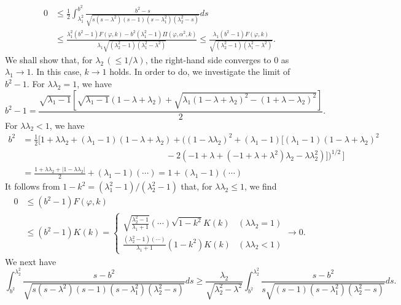 \documentclass[11pt]{amsart}
\numberwithin{equation}{section}
\numberwithin{figure}{section}
\theoremstyle{plain} %
\theoremstyle{definition} %
\begin{document}
\begin{align}
\nonumber 0 & \leq \frac{1}{2}\int_{\lambda_1^2}^{b^2} \frac{b^2-s}{\sqrt{s(s-\lambda^2)(s-1)(s-\lambda_1^2)(\lambda_2^2-s)}}ds \\
& \leq 
\frac{\lambda_1^2 (b^2-1) F (\varphi,k) 
- b^2 (\lambda_1^2-1) \Pi (\varphi,\alpha^2,k) }{\lambda_1 \sqrt{(\lambda_2^2-1)(\lambda_1^2-\lambda^2)}}
\leq 
\frac{\lambda_1 (b^2-1) F (\varphi,k)}{\sqrt{(\lambda_2^2-1)(\lambda_1^2-\lambda^2)}}. \label{key_estimates_1}
\end{align}
We shall show that, for $\lambda_2 \,(\leq 1/\lambda)$, the right-hand side converges to $0$ 
as $\lambda_1\to 1$. 
In this case, $k\to 1$ holds. In order to do, we investigate the limit of $b^2-1$. 
For $\lambda\lambda_2=1$, we have 
\[
 b^2-1 
 =\frac{\sqrt{\lambda_1-1} [ \sqrt{\lambda_1-1} (1-\lambda+\lambda_2)+\sqrt{\lambda_1(1-\lambda+\lambda_2)^2-(1+\lambda-\lambda_2)^2} ]}{2}. 
\]
For $\lambda\lambda_2< 1$, we have 
\begin{align*}
b^2 &= \frac{1}{2} \bigg[1+\lambda\lambda_2 + (\lambda_1-1)(1-\lambda+\lambda_2) 
+ \bigg((1-\lambda\lambda_2)^2 +(\lambda_1-1) [ (\lambda_1-1)(1-\lambda+\lambda_2)^2 \\
& \hspace{200pt} -2 (-1+\lambda+(-1+\lambda+\lambda^2) \lambda_2-\lambda\lambda_2^2)]\bigg)^{1/2}\, \bigg] \\
&= \frac{1+\lambda\lambda_2 + |1-\lambda\lambda_2|}{2} +(\lambda_1-1) (\cdots) 
 = 1 +(\lambda_1-1) (\cdots)
\end{align*}
It follows from $1-k^2 = (\lambda_1^2-1)/(\lambda_2^2-1)$ that, for $\lambda \lambda_2 \leq 1$, we find 
\begin{align*}
0 & \leq (b^2-1) F (\varphi,k) \\
& \leq (b^2-1) K (k) 
=
\begin{cases} 
\sqrt{\frac{\lambda_2^2-1}{\lambda_1+1}} (\cdots)\sqrt{1-k^2} K (k) & (\lambda\lambda_2=1) \\
\frac{(\lambda_2^2-1) (\cdots)}{\lambda_1+1} (1-k^2) K (k) & (\lambda\lambda_2<1) 
\end{cases} 
\to 0.  
\end{align*}
We next have 
\[
\int_{b^2}^{\lambda_2^2} \frac{s-b^2}{\sqrt{s(s-\lambda^2)(s-1)(s-\lambda_1^2)(\lambda_2^2-s)}}ds 
\geq 
\frac{\lambda_2}{\sqrt{\lambda_2^2-\lambda^2}} \int_{b^2}^{\lambda_2^2} \frac{s-b^2}{s\sqrt{(s-1)(s-\lambda_1^2)(\lambda_2^2-s)}}ds. 
\]
\end{document}
